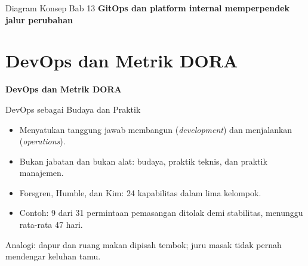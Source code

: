 \documentclass[aspectratio=169, table, 12pt]{beamer}
\begin{document}
\begin{frame}{{\Large Diagram Konsep Bab 13}}
  \centering
  {\small\bfseries GitOps dan platform internal memperpendek jalur perubahan}\par\medskip
\end{frame}

\section{DevOps dan Metrik DORA}

\begin{frame}{\hfill}
  \centering
  \Huge{\textbf{DevOps dan Metrik DORA}}
\end{frame}

\begin{frame}{{\Large DevOps sebagai Budaya dan Praktik}}
  \vspace{10pt}
  \begin{itemize}
    \item Menyatukan tanggung jawab membangun (\textit{development}) dan menjalankan
          (\textit{operations}).
    \item Bukan jabatan dan bukan alat: budaya, praktik teknis, dan praktik manajemen.
    \item Forsgren, Humble, dan Kim: 24 kapabilitas dalam lima kelompok.
    \item Contoh: 9 dari 31 permintaan pemasangan ditolak demi stabilitas, menunggu rata-rata
          47 hari.
  \end{itemize}
  \vspace{6pt}
  {\small Analogi: dapur dan ruang makan dipisah tembok; juru masak tidak pernah mendengar
  keluhan tamu.}
\end{frame}
\end{document}
